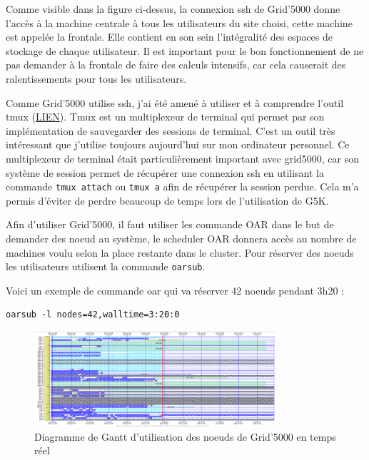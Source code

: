 \documentclass[a4paper,french,12pt, titlepage]{article}
\begin{document}
Comme visible dans la figure ci-dessus, la connexion ssh de Grid'5000
donne l'accès à la machine centrale à tous les utilisateurs du site
choisi, cette machine est appelée la frontale. Elle contient en son sein
l'intégralité des espaces de stockage de chaque utilisateur. Il est
important pour le bon fonctionnement de ne pas demander à la frontale de
faire des calculs intensifs, car cela causerait des ralentissements pour
tous les utilisateurs. \newline

Comme Grid'5000 utilise ssh, j'ai été amené à utiliser et à comprendre
l'outil tmux (\href{https://github.com/tmux/tmux/wiki}{LIEN}). Tmux est
un multiplexeur de terminal qui permet par son implémentation de
sauvegarder des sessions de terminal. C'est un outil très intéressant
que j'utilise toujours aujourd'hui sur mon ordinateur personnel. Ce
multiplexeur de terminal était particulièrement important avec grid5000,
car son système de session permet de récupérer une connexion ssh en
utilisant la commande \texttt{tmux\ attach} ou \texttt{tmux\ a} afin de
récupérer la session perdue. Cela m'a permis d'éviter de perdre beaucoup
de temps lors de l'utilisation de G5K.\newline

Afin d'utiliser Grid'5000, il faut utiliser les commande OAR dans le but
de demander des noeud au système, le scheduler OAR donnera accès au
nombre de machines voulu selon la place restante dans le cluster. Pour
réserver des noeuds les utilisateurs utilisent la commande
\texttt{oarsub}.

Voici un exemple de commande oar qui va réserver 42 noeuds pendant 3h20
:

\begin{verbatim}
oarsub -l nodes=42,walltime=3:20:0
\end{verbatim}

\begin{figure}[h]
\centering
\includegraphics[width=0.8\textwidth,height=0.8\textheight,keepaspectratio]{images/ganttg5k.png}
\caption{Diagramme de Gantt d'utilisation des noeuds de Grid'5000 en temps réel}
\end{figure}
\end{document}

